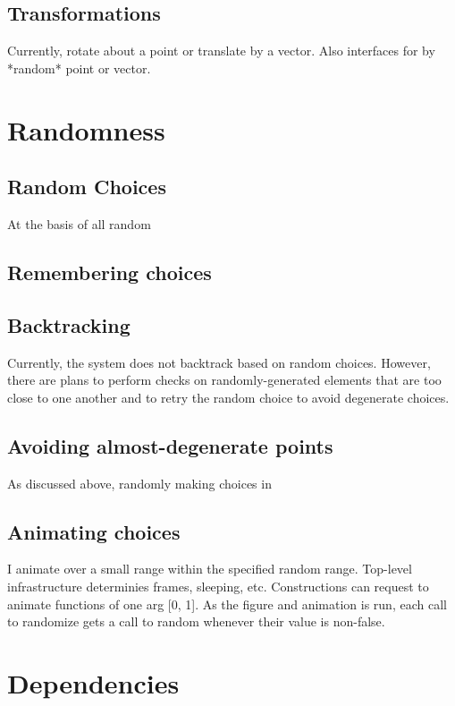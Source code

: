 \subsection{Transformations}

Currently, rotate about a point or translate by a vector. Also
interfaces for by *random* point or vector.

\section{Randomness}

\subsection{Random Choices}

At the basis of all random

\subsection{Remembering choices}

\subsection{Backtracking}

Currently, the system does not backtrack based on random
choices. However, there are plans to perform checks on
randomly-generated elements that are too close to one another and to
retry the random choice to avoid degenerate choices.

\subsection{Avoiding almost-degenerate points}

As discussed above, randomly making choices in

\subsection{Animating choices}

I animate over a small range within the specified random
range. Top-level infrastructure determinies frames, sleeping, etc.
Constructions can request to animate functions of one arg [0, 1]. As
the figure and animation is run, each call to randomize gets a call to
random whenever their value is non-false.

\section{Dependencies}

